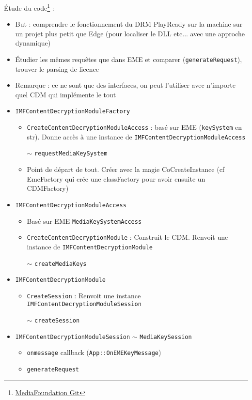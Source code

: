 \documentclass[french]{article}
\begin{document}
Étude du code\footnote{\href{https://github.com/microsoft/media-foundation/blob/master/samples/}{MediaFoundation Git}} :
\begin{itemize}
	\item But : comprendre le fonctionnement du DRM PlayReady sur la machine sur un projet plus petit que Edge (pour localiser le DLL etc... avec une approche dynamique)
	\item Étudier les mêmes requêtes que dans EME et comparer (\texttt{generateRequest}), trouver le parsing de licence
	\item Remarque : ce ne sont que des interfaces, on peut l'utiliser avec n'importe quel CDM qui implémente le tout
	
	\item \texttt{IMFContentDecryptionModuleFactory}
	\begin{itemize}
		\item \texttt{CreateContentDecryptionModuleAccess} : basé sur EME (\texttt{keySystem} en str). Donne accès à une instance de \texttt{IMFContentDecryptionModuleAccess} 
		\item[$\sim$] \texttt{requestMediaKeySystem}
		\item Point de départ de tout. Créer avec la magie CoCreateInstance (cf EmeFactory qui crée une classFactory pour avoir ensuite un CDMFactory)
	\end{itemize}
	
	\item \texttt{IMFContentDecryptionModuleAccess}
	\begin{itemize}
		\item Basé sur EME \texttt{MediaKeySystemAccess}
		\item \texttt{CreateContentDecryptionModule} : Construit le CDM. Renvoit une instance de \texttt{IMFContentDecryptionModule} 
		\item[$\sim$] \texttt{createMediaKeys}
	\end{itemize}
	
	\item \texttt{IMFContentDecryptionModule}
	\begin{itemize}
		\item \texttt{CreateSession} : Renvoit une instance \texttt{IMFContentDecryptionModuleSession}
		\item[$\sim$] \texttt{createSession}
	\end{itemize}
	
	\item \texttt{IMFContentDecryptionModuleSession} $\sim$ \texttt{MediaKeySession}
	\begin{itemize}
		\item \texttt{onmessage} callback (\texttt{App::OnEMEKeyMessage})
		\item \texttt{generateRequest}
	\end{itemize}
	

\end{itemize}
\end{document}
